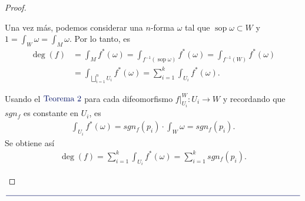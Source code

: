 \documentclass[11pt]{article}
\newcommand{\sop}{\operatorname{sop}}
\newcommand{\paint}[1]{\color{color}{#1}}
\newcommand{\tpaing}[1]{\paint{\text{#1}}}
\newcommand{\paintline}{\begin{center}
$\paint{
\rule{400pt}{0.5pt}
}$
\vspace{10pt}
\end{center}}
\begin{document}
\begin{proof}
\begin{itemize}[listparindent = \parindent]
Una vez más, podemos considerar una $n$-forma $\omega$ tal que $\sop \omega \subset W$ y $1 = \int_W \omega= \int_M \omega$. Por lo tanto, es
\begin{align*}
\deg(f) &= \int_Mf^*(\omega) = \int_{f^{-1}(\sop \omega)}f^*(\omega) = \int_{f^{-1}(W)}f^*(\omega)\\
&= \int_{\bigsqcup_{i=1}^nU_i}f^*(\omega) = \sum_{i=1}^k \int_{U_i}f^*(\omega).
\end{align*}

Usando el $\tpaing{Teorema $2$}$ para cada difeomorfismo $f|_{U_i}^W : U_i \to W$ y recordando que $sgn_f$ es constante en $U_i$, es
\begin{align*}
\int_{U_i}f^*(\omega) = sgn_f(p_i) \cdot \int_W\omega = sgn_f(p_i).
\end{align*}
Se obtiene así
\begin{align*}
\deg(f) = \sum_{i=1}^k \int_{U_i}f^*(\omega) = \sum_{i=1}^k sgn_f(p_i).
\end{align*}
\end{itemize}
\end{proof}

\paintline
\end{document}
